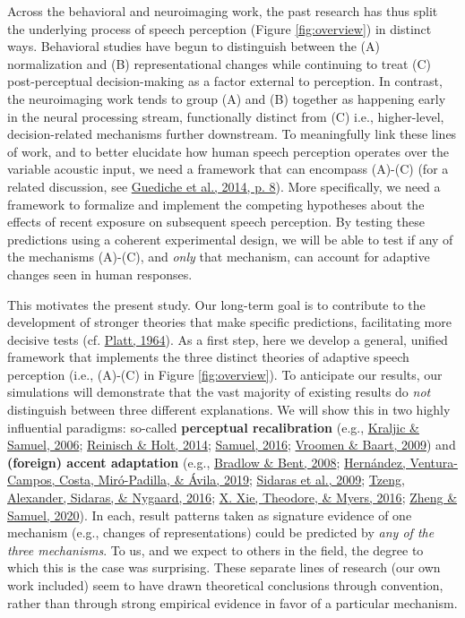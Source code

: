 \documentclass[
  11pt,
  man,floatsintext]{apa6}
\begin{document}
Across the behavioral and neuroimaging work, the past research has thus split the underlying process of speech perception (Figure \ref{fig:overview}) in distinct ways. Behavioral studies have begun to distinguish between the (A) normalization and (B) representational changes while continuing to treat (C) post-perceptual decision-making as a factor external to perception. In contrast, the neuroimaging work tends to group (A) and (B) together as happening early in the neural processing stream, functionally distinct from (C) i.e., higher-level, decision-related mechanisms further downstream. To meaningfully link these lines of work, and to better elucidate how human speech perception operates over the variable acoustic input, we need a framework that can encompass (A)-(C) (for a related discussion, see \protect\hyperlink{ref-guediche2014}{Guediche et al., 2014, p. 8}). More specifically, we need a framework to formalize and implement the competing hypotheses about the effects of recent exposure on subsequent speech perception. By testing these predictions using a coherent experimental design, we will be able to test if any of the mechanisms (A)-(C), and \emph{only} that mechanism, can account for adaptive changes seen in human responses.

This motivates the present study. Our long-term goal is to contribute to the development of stronger theories that make specific predictions, facilitating more decisive tests (cf. \protect\hyperlink{ref-platt1964}{Platt, 1964}). As a first step, here we develop a general, unified framework that implements the three distinct theories of adaptive speech perception (i.e., (A)-(C) in Figure \ref{fig:overview}). To anticipate our results, our simulations will demonstrate that the vast majority of existing results do \emph{not} distinguish between three different explanations. We will show this in two highly influential paradigms: so-called \textbf{perceptual recalibration} (e.g., \protect\hyperlink{ref-kraljic-samuel2006}{Kraljic \& Samuel, 2006}; \protect\hyperlink{ref-reinisch-holt2014}{Reinisch \& Holt, 2014}; \protect\hyperlink{ref-samuel2016}{Samuel, 2016}; \protect\hyperlink{ref-vroomen-baart2009}{Vroomen \& Baart, 2009}) and \textbf{(foreign) accent adaptation} (e.g., \protect\hyperlink{ref-bradlow-bent2008}{Bradlow \& Bent, 2008}; \protect\hyperlink{ref-hernandez2019}{Hernández, Ventura-Campos, Costa, Miró-Padilla, \& Ávila, 2019}; \protect\hyperlink{ref-sidaras2009}{Sidaras et al., 2009}; \protect\hyperlink{ref-tzeng2016}{Tzeng, Alexander, Sidaras, \& Nygaard, 2016}; \protect\hyperlink{ref-xie2016jep}{X. Xie, Theodore, \& Myers, 2016}; \protect\hyperlink{ref-zheng-samuel2020}{Zheng \& Samuel, 2020}). In each, result patterns taken as signature evidence of one mechanism (e.g., changes of representations) could be predicted by \emph{any of the three mechanisms}. To us, and we expect to others in the field, the degree to which this is the case was surprising. These separate lines of research (our own work included) seem to have drawn theoretical conclusions through convention, rather than through strong empirical evidence in favor of a particular mechanism.
\end{document}
